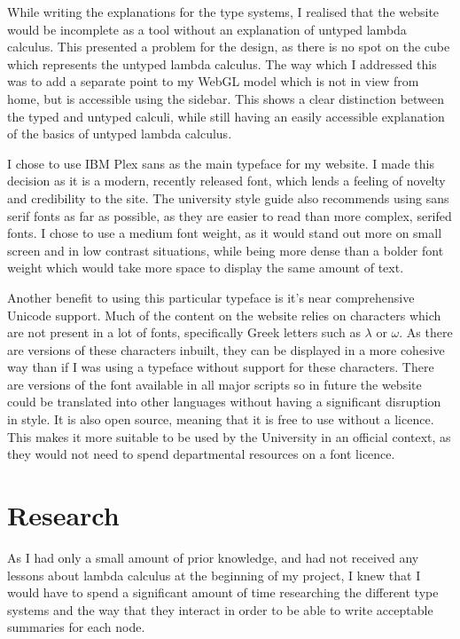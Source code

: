 \documentclass{l4proj}
\begin{document}
While writing the explanations for the type systems, I realised that the website would be incomplete as a tool without an explanation of untyped lambda calculus.  This presented a problem for the design, as there is no spot on the cube which represents the untyped lambda calculus.  The way which I addressed this was to add a separate point to my WebGL model which is not in view from home, but is accessible using the sidebar.  This shows a clear distinction between the typed and untyped calculi, while still having an easily accessible explanation of the basics of untyped lambda calculus.

I chose to use IBM Plex sans as the main typeface for my website.  I made this decision as it is a modern, recently released font, which lends a feeling of novelty and credibility to the site.  The university style guide also recommends using sans serif fonts as far as possible, as they are easier to read than more complex, serifed fonts.  I chose to use a medium font weight, as it would stand out more on small screen and in low contrast situations, while being more dense than a bolder font weight which would take more space to display the same amount of text.

Another benefit to using this particular typeface is it's near comprehensive Unicode support.  Much of the content on the website relies on characters which are not present in a lot of fonts, specifically Greek letters such as $\lambda$ or $\omega$.  As there are versions of these characters inbuilt, they can be displayed in a more cohesive way than if I was using a typeface without support for these characters.  There are versions of the font available in all major scripts so in future the website could be translated into other languages without having a significant disruption in style.  It is also open source, meaning that it is free to use without a licence.  This makes it more suitable to be used by the University in an official context, as they would not need to spend departmental resources on a font licence.

\section{Research}

As I had only a small amount of prior knowledge, and had not received any lessons about lambda calculus at the beginning of my project, I knew that I would have to spend a significant amount of time researching the different type systems and the way that they interact in order to be able to write acceptable summaries for each node.
\end{document}
